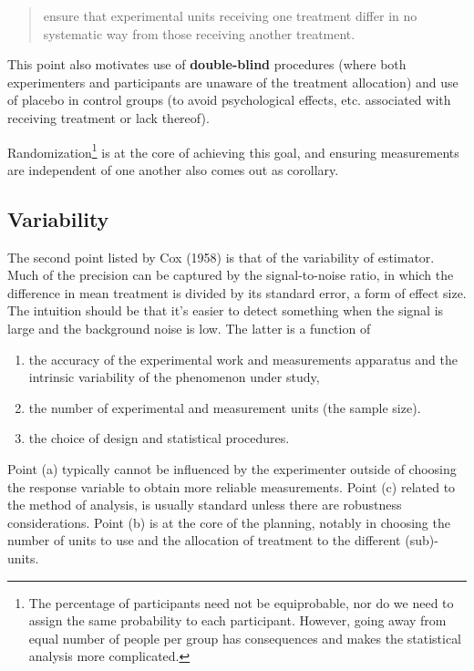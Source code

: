 \documentclass[
  11pt,
  letterpaper,
]{scrbook}
\providecommand{\tightlist}{%
  \setlength{\itemsep}{0pt}\setlength{\parskip}{0pt}}\usepackage{longtable,booktabs,array}
\theoremstyle{definition}
\theoremstyle{definition}
\theoremstyle{remark}
\begin{document}
\begin{quote}
ensure that experimental units receiving one treatment differ in no
systematic way from those receiving another treatment.
\end{quote}

This point also motivates use of \textbf{double-blind} procedures (where
both experimenters and participants are unaware of the treatment
allocation) and use of placebo in control groups (to avoid psychological
effects, etc. associated with receiving treatment or lack thereof).

Randomization\footnote{The percentage of participants need not be
  equiprobable, nor do we need to assign the same probability to each
  participant. However, going away from equal number of people per group
  has consequences and makes the statistical analysis more complicated.}
is at the core of achieving this goal, and ensuring measurements are
independent of one another also comes out as corollary.

\subsection{Variability}\label{variability}

The second point listed by Cox (1958) is that of the variability of
estimator. Much of the precision can be captured by the signal-to-noise
ratio, in which the difference in mean treatment is divided by its
standard error, a form of effect size. The intuition should be that it's
easier to detect something when the signal is large and the background
noise is low. The latter is a function of

\begin{enumerate}
\def\labelenumi{(\alph{enumi})}
\tightlist
\item
  the accuracy of the experimental work and measurements apparatus and
  the intrinsic variability of the phenomenon under study,
\item
  the number of experimental and measurement units (the sample size).
\item
  the choice of design and statistical procedures.
\end{enumerate}

Point (a) typically cannot be influenced by the experimenter outside of
choosing the response variable to obtain more reliable measurements.
Point (c) related to the method of analysis, is usually standard unless
there are robustness considerations. Point (b) is at the core of the
planning, notably in choosing the number of units to use and the
allocation of treatment to the different (sub)-units.
\end{document}
